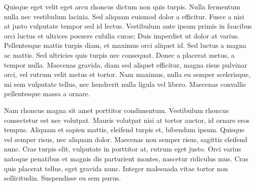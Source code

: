 \documentclass[a4paper]{article}
\begin{document}
    \begin{answer}
        Quisque eget velit eget arcu rhoncus dictum non quis turpis. Nulla fermentum nulla nec vestibulum lacinia. Sed aliquam euismod dolor a efficitur. Fusce a nisi at justo vulputate tempor sed id lectus. Vestibulum ante ipsum primis in faucibus orci luctus et ultrices posuere cubilia curae; Duis imperdiet ut dolor at varius. Pellentesque mattis turpis diam, et maximus orci aliquet id. Sed luctus a magna ac mattis. Sed ultricies quis turpis nec consequat. Donec a placerat metus, a tempor nulla. Maecenas gravida, diam sed aliquet efficitur, magna risus pulvinar orci, vel rutrum velit metus et tortor. Nam maximus, nulla eu semper scelerisque, mi sem vulputate tellus, nec hendrerit nulla ligula vel libero. Maecenas convallis pellentesque massa a ornare.

        Nam rhoncus magna sit amet porttitor condimentum. Vestibulum rhoncus consectetur est nec volutpat. Mauris volutpat nisi at tortor auctor, id ornare eros tempus. Aliquam et sapien mattis, eleifend turpis et, bibendum ipsum. Quisque vel semper risus, nec aliquam dolor. Maecenas non semper risus, sagittis eleifend nunc. Cras turpis elit, vulputate in porttitor at, rutrum eget justo. Orci varius natoque penatibus et magnis dis parturient montes, nascetur ridiculus mus. Cras quis placerat tellus, eget gravida nunc. Integer malesuada vitae tortor non sollicitudin. Suspendisse eu sem purus.
    \end{answer}
\end{document}
